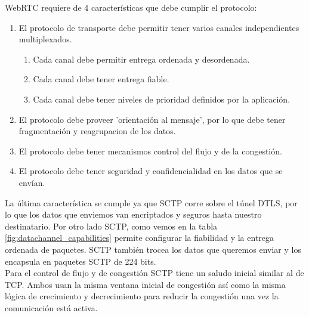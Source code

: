 \noindent WebRTC requiere de 4 características que debe cumplir el protocolo:

\begin{enumerate}
\item El protocolo de transporte debe permitir tener varios canales independientes multiplexados.
\begin{enumerate}
\item Cada canal debe permitir entrega ordenada y desordenada.
\item Cada canal debe tener entrega fiable.
\item Cada canal debe tener niveles de prioridad definidos por la aplicación.
\end{enumerate}
\item El protocolo debe proveer 'orientación al mensaje', por lo que debe tener fragmentación y reagrupacion de los datos.
\item El protocolo debe tener mecanismos control del flujo y de la congestión.
\item El protocolo debe tener seguridad y confidencialidad en los datos que se envían.
\end{enumerate}

La última característica se cumple ya que SCTP corre sobre el túnel DTLS, por lo que los datos que enviemos van encriptados y seguros hasta nuestro destinatario. Por otro lado SCTP, como vemos en la tabla \ref{fig:datachannel_capabilities} permite configurar la fiabilidad y la entrega ordenada de paquetes. SCTP también trocea los datos que queremos enviar y los encapsula en paquetes SCTP de 224 bits.\\

Para el control de flujo y de congestión SCTP tiene un saludo inicial similar al de TCP. Ambos usan la misma ventana inicial de congestión así como la misma lógica de crecimiento y decrecimiento para reducir la congestión una vez la comunicación está activa.\\


